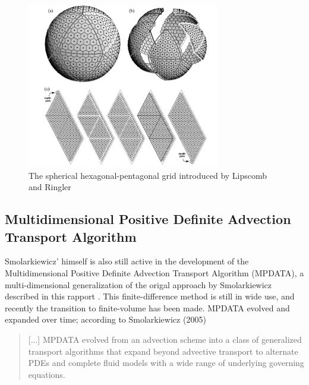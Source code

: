 \documentclass[10pt, a4paper]{article}
\newcommand{\imsize}{}
\begin{document}
\begin{figure}[htp]
\centering
\renewcommand{\imsize}{0.75\textwidth}
\includegraphics[width=\imsize]{figures/lipcomb}%
\caption{\label{fig:hexpent} The spherical hexagonal-pentagonal grid introduced by Lipscomb and Ringler \cite{lipscomb}}
\end{figure}

\subsection{Multidimensional Positive Definite Advection Transport Algorithm}
Smolarkiewicz' himself is also still active in the development of the Multidimensional Positive Definite Advection Transport Algorithm (MPDATA), a multi-dimensional generalization of the origal approach by Smolarkiewicz described in this rapport \cite{mpdata}. This finite-difference method is still in wide use, and recently the transition to finite-volume has been made. MPDATA evolved and expanded over time; according to Smolarkiewicz (2005)
\begin{quotation}
[...] MPDATA evolved from an advection scheme into a class of generalized transport algorithms that expand beyond advective transport to alternate PDEs and complete fluid models with a wide range of underlying governing equations.
\end{quotation}
\end{document}
